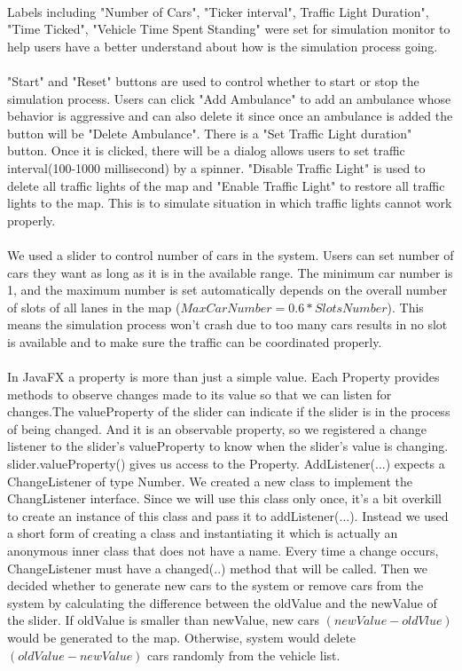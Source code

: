 \documentclass[a4paper,11pt,titlepage]{article}
\begin{document}
\paragraph{}
Labels including "Number of Cars", "Ticker interval", Traffic Light Duration", "Time Ticked", "Vehicle Time Spent Standing" were set for simulation monitor to help users have a better understand about how is the simulation process going. 
\paragraph{}
"Start" and "Reset" buttons are used to control whether to start or stop the simulation process. Users can click "Add Ambulance" to add an ambulance whose behavior is aggressive and can also delete it since once an ambulance is added the button will be "Delete Ambulance". There is a "Set Traffic Light duration" button. Once it is clicked, there will be a dialog allows users to set traffic interval(100-1000 millisecond) by a spinner. "Disable Traffic Light" is used to delete all traffic lights of the map and "Enable Traffic Light" to restore all traffic lights to the map. This is to simulate situation in which traffic lights cannot work properly. 
\paragraph{}
We used a slider to control number of cars in the system. Users can set number of cars they want as long as  it is in the available range. The minimum car number is 1, and the maximum number is set automatically depends on the overall number of slots of all lanes in the map ($MaxCarNumber=0.6*SlotsNumber$). This means the simulation process won't crash due to too many cars results in no slot is available and to make sure the traffic can be coordinated properly. 
\paragraph{}
In JavaFX a property is more than just a simple value. Each Property provides methods to observe changes made to its value so that we can listen for changes.The valueProperty of the slider can indicate if the slider is in the process of being changed. And it is an observable property, so we registered a change listener to the slider's valueProperty to know when the slider's value is changing. slider.valueProperty() gives us access to the Property. AddListener(...) expects a ChangeListener of type Number. We created a new class to implement the ChangListener interface. Since we will use this class only once, it's a bit overkill to create an instance of this class and pass it to addListener(...). Instead we used a short form of creating a class and instantiating it which is actually an anonymous inner class that does not have a name. Every time a change occurs, ChangeListener must have a changed(..) method that will be called. Then we decided whether to generate new cars to the system or remove cars from the system by calculating the difference between the oldValue and the newValue of the slider.
If oldValue is smaller than newValue, new cars $(newValue - oldVlue)$ would be generated to the map. Otherwise, system would delete $(oldValue - newValue)$ cars randomly from the vehicle list. 
\end{document}
